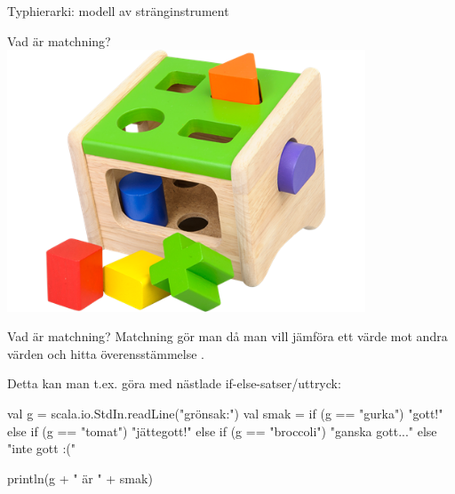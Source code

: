 \begin{Slide}{Typhierarki: modell av stränginstrument}
\begin{center}
\end{center}
\end{Slide}





\begin{Slide}{Vad är matchning?}
\includegraphics[width=0.8\textwidth]{../img/plocklada.png}
\end{Slide}


\begin{Slide}{Vad är matchning?}
Matchning gör man då man vill jämföra ett värde mot andra värden och hitta överensstämmelse .

\pause

\vspace{1em}Detta kan man t.ex. göra med nästlade if-else-satser/uttryck:

\begin{Code}
val g = scala.io.StdIn.readLine("grönsak:")
val smak =
  if (g == "gurka") "gott!"
  else if (g == "tomat") "jättegott!"
  else if (g == "broccoli") "ganska gott..."
  else "inte gott :("

println(g + " är " + smak)
\end{Code}
\end{Slide}





